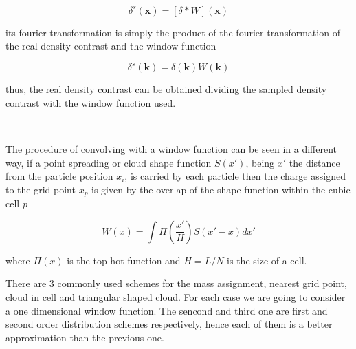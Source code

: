 \begin{equation}
\delta^s(\textbf{x}) = [\delta*W](\textbf{x})
\label{df_conv}
\end{equation}

its fourier transformation is simply the product of the fourier transformation of the real 
density contrast and the window function 

\begin{equation}
\delta^s(\textbf{k}) = \delta(\textbf{k})W(\textbf{k})
\label{df_four}
\end{equation}

thus, the real density contrast can be obtained dividing the sampled density contrast with
the window function used. 

\

The procedure of convolving with a window function can be seen in a different way, if a 
point spreading or cloud shape function $S(x')$, being $x'$ the distance from the particle
position $x_i$, is carried by each particle then the charge assigned to the grid point $x_p$ 
is given by the overlap of the shape function within the cubic cell $p$

\[W(x)=\int \Pi \left(\frac{x'}{H} \right) S(x'-x)dx' \]

where $\Pi(x)$ is the top hot function and $H=L/N$ is the size of a cell. 

There are 3 commonly used schemes for the mass assignment, nearest grid point, cloud
in cell and triangular shaped cloud. For each case we are going to consider a one dimensional
window function. The sencond and third one are first and second order distribution schemes
respectively, hence each of them is a better approximation than the previous one. 

